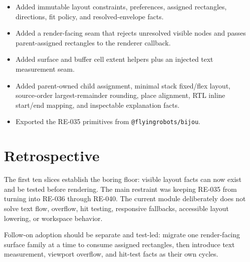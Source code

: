 \begin{itemize}
\tightlist
\item
  Added immutable layout constraints, preferences, assigned rectangles, directions, fit policy, and resolved-envelope facts.
\item
  Added a render-facing seam that rejects unresolved visible nodes and passes parent-assigned rectangles to the renderer callback.
\item
  Added surface and buffer cell extent helpers plus an injected text measurement seam.
\item
  Added parent-owned child assignment, minimal stack fixed/flex layout, source-order largest-remainder rounding, place alignment, RTL inline start/end mapping, and inspectable explanation facts.
\item
  Exported the RE-035 primitives from \texttt{@\allowbreak{}f\allowbreak{}l\allowbreak{}y\allowbreak{}i\allowbreak{}n\allowbreak{}g\allowbreak{}r\allowbreak{}o\allowbreak{}b\allowbreak{}o\allowbreak{}t\allowbreak{}s\allowbreak{}/\allowbreak{}b\allowbreak{}i\allowbreak{}j\allowbreak{}o\allowbreak{}u}.
\end{itemize}

\section{Retrospective}\label{record-163-retrospective}

The first ten slices establish the boring floor: visible layout facts can now exist and be tested before rendering. The main restraint was keeping RE-035 from turning into RE-036 through RE-040. The current module deliberately does not solve text flow, overflow, hit testing, responsive fallbacks, accessible layout lowering, or workspace behavior.

Follow-on adoption should be separate and test-led: migrate one render-facing surface family at a time to consume assigned rectangles, then introduce text measurement, viewport overflow, and hit-test facts as their own cycles.

